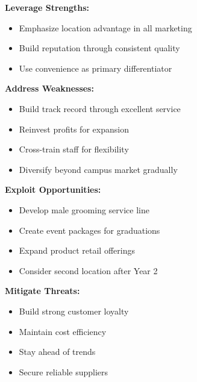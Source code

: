 \vspace{1.5em}

\begin{center}
\begin{tcolorbox}[mybox, title=\textbf{Strategic Implications of SWOT Analysis}, width=0.9\textwidth]
\textbf{Leverage Strengths:}
\begin{itemize}[leftmargin=1em, itemsep=2pt]
    \item Emphasize location advantage in all marketing
    \item Build reputation through consistent quality
    \item Use convenience as primary differentiator
\end{itemize}

\textbf{Address Weaknesses:}
\begin{itemize}[leftmargin=1em, itemsep=2pt]
    \item Build track record through excellent service
    \item Reinvest profits for expansion
    \item Cross-train staff for flexibility
    \item Diversify beyond campus market gradually
\end{itemize}

\textbf{Exploit Opportunities:}
\begin{itemize}[leftmargin=1em, itemsep=2pt]
    \item Develop male grooming service line
    \item Create event packages for graduations
    \item Expand product retail offerings
    \item Consider second location after Year 2
\end{itemize}

\textbf{Mitigate Threats:}
\begin{itemize}[leftmargin=1em, itemsep=2pt]
    \item Build strong customer loyalty
    \item Maintain cost efficiency
    \item Stay ahead of trends
    \item Secure reliable suppliers
\end{itemize}
\end{tcolorbox}
\end{center}

\vspace{1em}

